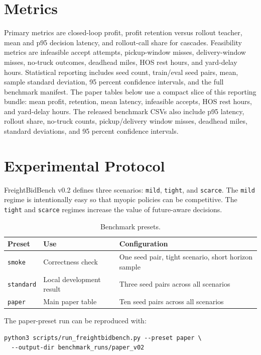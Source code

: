\documentclass[11pt]{article}
\begin{document}
\section{Metrics}

Primary metrics are closed-loop profit, profit retention versus rollout
teacher, mean and p95 decision latency, and rollout-call share for cascades.
Feasibility metrics are infeasible accept attempts, pickup-window misses,
delivery-window misses, no-truck outcomes, deadhead miles, HOS rest hours, and
yard-delay hours. Statistical reporting includes seed count, train/eval seed
pairs, mean, sample standard deviation, 95 percent confidence intervals, and
the full benchmark manifest. The paper tables below use a compact slice of this
reporting bundle: mean profit, retention, mean latency, infeasible accepts, HOS
rest hours, and yard-delay hours. The released benchmark CSVs also include p95
latency, rollout share, no-truck counts, pickup/delivery window misses,
deadhead miles, standard deviations, and 95 percent confidence intervals.

\section{Experimental Protocol}

FreightBidBench v0.2 defines three scenarios: \texttt{mild}, \texttt{tight},
and \texttt{scarce}. The \texttt{mild} regime is intentionally easy so that
myopic policies can be competitive. The \texttt{tight} and \texttt{scarce}
regimes increase the value of future-aware decisions.

\begin{table}[t]
\centering
\caption{Benchmark presets.}
\begin{tabular}{lll}
\toprule
Preset & Use & Configuration \\
\midrule
\texttt{smoke} & Correctness check & One seed pair, tight scenario, short horizon sample \\
\texttt{standard} & Local development result & Three seed pairs across all scenarios \\
\texttt{paper} & Main paper table & Ten seed pairs across all scenarios \\
\bottomrule
\end{tabular}
\label{tab:presets}
\end{table}

The paper-preset run can be reproduced with:
\begin{verbatim}
python3 scripts/run_freightbidbench.py --preset paper \
  --output-dir benchmark_runs/paper_v02
\end{verbatim}
\end{document}
